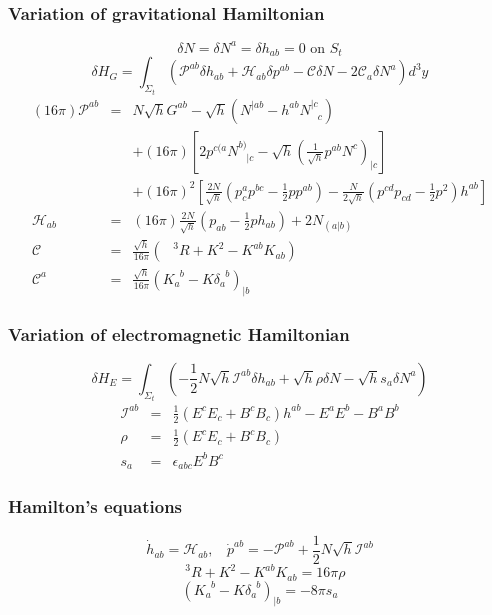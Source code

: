 \subsubsection{Variation of gravitational Hamiltonian}
\[\delta N = \delta N^a = \delta h_{ab} = 0 \mbox{ on } S_t\]
\[\delta H_G = \int_{\Sigma_t} (\mathcal{P}^{ab} \delta h_{ab} + \mathcal{H}_{ab} \delta p^{ab} - \mathcal{C}\delta N - 2\mathcal{C}_a \delta N^a) d^3 y\]
\begin{eqnarray}
(16\pi)\mathcal{P}^{ab} &=&  N\sqrt{h}G^{ab} - \sqrt{h}(N^{|ab} - h^{ab} N^{|c}_{\phantom{|c}c}) \nonumber \\
&\phantom{=}& +(16\pi)[2p^{c(a}N^{b)}_{\phantom{b)}|c} - \sqrt{h}(\frac{1}{\sqrt{h}}p^{ab}N^c)_{|c}] \nonumber \\
&\phantom{=}& + (16\pi)^2 [\frac{2N}{\sqrt{h}} (p^a_c p^{bc} - \frac{1}{2} p p^{ab}) - \frac{N}{2\sqrt{h}}(p^{cd}p_{cd} - \frac{1}{2} p^2)h^{ab}] \nonumber \\
\mathcal{H}_{ab} &=& (16\pi) \frac{2N}{\sqrt{h}} (p_{ab} - \frac{1}{2}p h_{ab}) + 2N_{(a|b)} \nonumber \\
\mathcal{C} &=& \frac{\sqrt{h}}{16\pi} (\phantom{R}^3R + K^2 - K^{ab}K_{ab}) \nonumber \\
\mathcal{C}^a &=& \frac{\sqrt{h}}{16\pi} (K_a^{\phantom{a}b} - K \delta_a^{\phantom{a}b})_{|b} \nonumber 
\end{eqnarray}

\subsubsection{Variation of electromagnetic Hamiltonian}
\[\delta H_E = \int_{\Sigma_t}(-\frac{1}{2}N\sqrt{h}\mathcal{I}^{ab} \delta h_{ab} + \sqrt{h} \rho \delta N - \sqrt{h} s_a \delta N^a)\]
\begin{eqnarray}
\mathcal{I}^{ab} &=& \frac{1}{2}(E^c E_c + B^c B_c)h^{ab} - E^a E^b - B^a B^b \nonumber \\
\rho &=& \frac{1}{2}(E^c E_c + B^c B_c) \nonumber \\
s_a &=& \epsilon_{abc} E^b B^c \nonumber
\end{eqnarray}

\subsubsection{Hamilton's equations}
\[\dot{h}_{ab} = \mathcal{H}_{ab}, \ \ \ \ \dot{p}^{ab} = -\mathcal{P}^{ab}+\frac{1}{2}N\sqrt{h}\mathcal{I}^{ab}\]
\[\phantom{R}^3R + K^2 - K^{ab}K_{ab} = 16 \pi \rho\]
\[(K_a^{\phantom{a}b} - K \delta_a^{\phantom{a}b})_{|b} = -8\pi s_a\]
